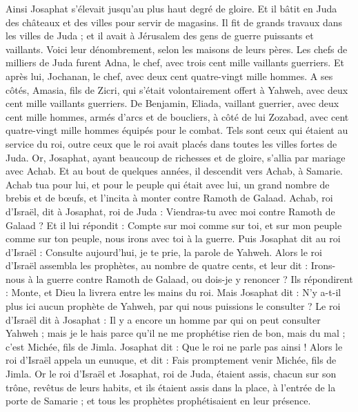 \begin{multicols}{2}
Ainsi Josaphat s'élevait jusqu’au plus haut degré de gloire. Et il bâtit en Juda des châteaux et des villes pour servir de magasins.
Il fit de grands travaux dans les villes de Juda ; et il avait à Jérusalem des gens de guerre puissants et vaillants.
Voici leur dénombrement, selon les maisons de leurs pères. Les chefs de milliers de Juda furent Adna, le chef, avec trois cent mille vaillants guerriers.
Et après lui, Jochanan, le chef, avec deux cent quatre-vingt mille hommes.
A ses côtés, Amasia, fils de Zicri, qui s'était volontairement offert à Yahweh, avec deux cent mille vaillants guerriers.
De Benjamin, Eliada, vaillant guerrier, avec deux cent mille hommes, armés d'arcs et de boucliers,
à côté de lui Zozabad, avec cent quatre-vingt mille hommes équipés pour le combat.
Tels sont ceux qui étaient au service du roi, outre ceux que le roi avait placés dans toutes les villes fortes de Juda.
\VerseOne{}Or, Josaphat, ayant beaucoup de richesses et de gloire, s'allia par mariage avec Achab.
Et au bout de quelques années, il descendit vers Achab, à Samarie. Achab tua pour lui, et pour le peuple qui était avec lui, un grand nombre de brebis et de bœufs, et l'incita à monter contre Ramoth de Galaad.
Achab, roi d'Israël, dit à Josaphat, roi de Juda : Viendras-tu avec moi contre Ramoth de Galaad ? Et il lui répondit : Compte sur moi comme sur toi, et sur mon peuple comme sur ton peuple, nous irons avec toi à la guerre.
Puis Josaphat dit au roi d'Israël : Consulte aujourd’hui, je te prie, la parole de Yahweh.
Alors le roi d'Israël assembla les prophètes, au nombre de quatre cents, et leur dit : Irons-nous à la guerre contre Ramoth de Galaad, ou dois-je y renoncer ? Ils répondirent : Monte, et Dieu la livrera entre les mains du roi.
Mais Josaphat dit : N'y a-t-il plus ici aucun prophète de Yahweh, par qui nous puissions le consulter ?
Le roi d'Israël dit à Josaphat : Il y a encore un homme par qui on peut consulter Yahweh ; mais je le hais parce qu’il ne me prophétise rien de bon, mais du mal ; c'est Michée, fils de Jimla. Josaphat dit : Que le roi ne parle pas ainsi !
Alors le roi d'Israël appela un eunuque, et dit : Fais promptement venir Michée, fils de Jimla.
Or le roi d'Israël et Josaphat, roi de Juda, étaient assis, chacun sur son trône, revêtus de leurs habits, et ils étaient assis dans la place, à l'entrée de la porte de Samarie ; et tous les prophètes prophétisaient en leur présence.

\end{multicols}
